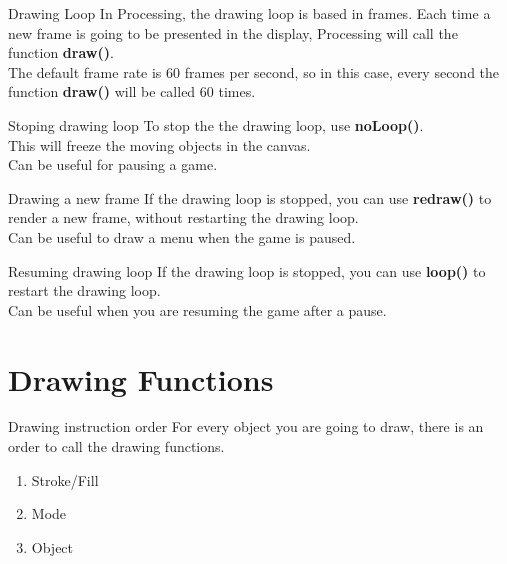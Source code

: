 \documentclass{beamer}
\begin{document}
\begin{frame}{Drawing Loop}
In Processing, the drawing loop is based in frames.
Each time a new frame is going to be presented in the display,
Processing will call the function \textbf{draw()}.\\ 
The default frame rate is 60 frames per second, so in this case, 
every second the function \textbf{draw()} will be called 60 times.
\end{frame}

\begin{frame}{Stoping drawing loop}
To stop the the drawing loop, use \textbf{noLoop()}.\\
This will freeze the moving objects in the canvas.\\

Can be useful for pausing a game.
\end{frame}

\begin{frame}{Drawing a new frame}
If the drawing loop is stopped, you can use \textbf{redraw()} to 
render a new frame, without restarting the drawing loop.\\

Can be useful to draw a menu when the game is paused.
\end{frame}

\begin{frame}{Resuming drawing loop}
If the drawing loop is stopped, you can use \textbf{loop()} to
restart the drawing loop.\\

Can be useful when you are resuming the game after a pause.
\end{frame}

\section{Drawing Functions}

\begin{frame}{Drawing instruction order}
For every object you are going to draw, there is an order to call
the drawing functions.\\

\begin{enumerate}
\item{Stroke/Fill}
\item{Mode}
\item{Object}
\end{enumerate}
\end{frame}
\end{document}
